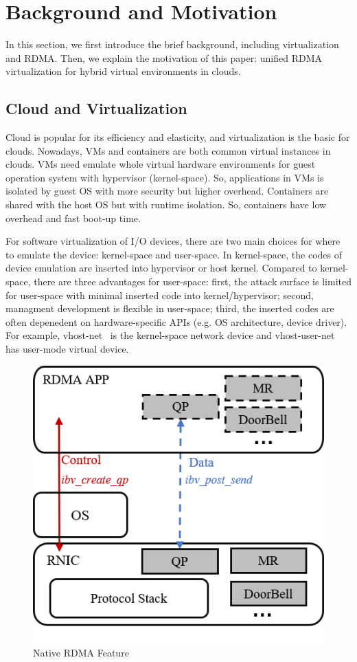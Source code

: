 \section{Background and Motivation}
In this section, we first introduce the brief background, including virtualization and RDMA. Then, we explain the motivation of this paper: unified RDMA virtualization for hybrid virtual environments in clouds.

\subsection{Cloud and Virtualization}
Cloud is popular for its efficiency and elasticity, and virtualization is the basic for clouds. Nowadays, VMs and containers are both common virtual instances in clouds. VMs need emulate whole virtual hardware environments for guest operation system with hypervisor (kernel-space). So, applications in VMs is isolated by guest OS with more security but higher overhead. Containers are shared with the host OS but with runtime isolation. So, containers have low overhead and fast boot-up time.

For software virtualization of I/O devices, there are two main choices for where to emulate the device: kernel-space and user-space. In kernel-space, the codes of device emulation are inserted into hypervisor or host kernel. Compared to kernel-space, there are three advantages for user-space: first, the attack surface is limited for user-space with minimal inserted code into kernel/hypervisor; second, managment development is flexible in user-space; third, the inserted codes are often depenedent on hardware-specific APIs (e.g. OS architecture, device driver). For example, vhost-net~\cite{vhost-net} is the kernel-space network device and vhost-user-net~\cite{vhost-user-net} has user-mode virtual device. 

\begin{figure}[!ht]
\centering
\includegraphics[width=0.6\linewidth]{images/rdma-feat.png}
\caption{Native RDMA Feature}
\label{fig:rdma-feat}
\end{figure}

